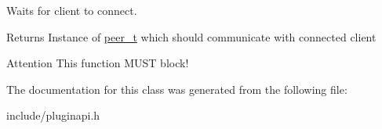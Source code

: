 \-Waits for client to connect. 

\begin{DoxyReturn}{\-Returns}
\-Instance of \hyperlink{classpeer__t}{peer\-\_\-t} which should communicate with connected client 
\end{DoxyReturn}
\begin{DoxyAttention}{\-Attention}
\-This function \-M\-U\-S\-T block! 
\end{DoxyAttention}


\-The documentation for this class was generated from the following file\-:\begin{DoxyCompactItemize}
\item 
include/pluginapi.\-h\end{DoxyCompactItemize}
